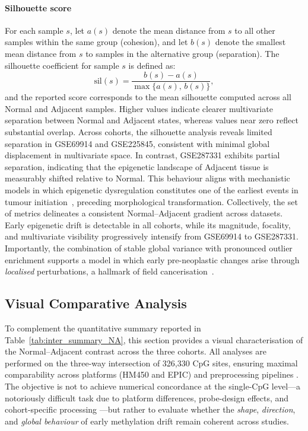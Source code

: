 \paragraph{Silhouette score}  

For each sample $s$, let $a(s)$ denote the mean distance from $s$ to all other samples within the same group (cohesion), and let $b(s)$ denote the smallest mean distance from $s$ to samples in the alternative group (separation).  
The silhouette coefficient for sample $s$ is defined as:
\begin{equation}
\mathrm{sil}(s) =
\frac{b(s) - a(s)}{\max\{a(s),\, b(s)\}},
\label{eq:silhouette}
\end{equation}
and the reported score corresponds to the mean silhouette computed across all Normal and Adjacent samples.
Higher values indicate clearer multivariate separation between Normal and Adjacent states, whereas values near zero reflect substantial overlap. Across cohorts, the silhouette analysis reveals limited separation in GSE69914 and GSE225845, consistent with minimal global displacement in multivariate space. In contrast, GSE287331 exhibits partial separation, indicating that the epigenetic landscape of Adjacent tissue is measurably shifted relative to Normal. This behaviour aligns with mechanistic models in which epigenetic dysregulation constitutes one of the earliest events in tumour initiation~\cite{Zhang2024_TumorInitiationEpigenetic}, preceding morphological transformation.
Collectively, the set of metrics delineates a consistent Normal--Adjacent gradient across datasets. Early epigenetic drift is detectable in all cohorts, while its magnitude, focality, and multivariate visibility progressively intensify from GSE69914 to GSE287331. Importantly, the combination of stable global variance with pronounced outlier enrichment supports a model in which early pre-neoplastic changes arise through \emph{localised} perturbations, a hallmark of field cancerisation~\cite{Teschendorff2016fielddefects, Yates2024_NormalMucosaField}.

\subsection{Visual Comparative Analysis}
\label{subsec:inter_visual}

To complement the quantitative summary reported in 
Table~\ref{tab:inter_summary_NA}, this section provides a visual 
characterisation of the Normal--Adjacent contrast across the three 
cohorts. All analyses are performed on the three-way intersection of 
326{,}330 CpG sites, ensuring maximal comparability across platforms 
(HM450 and EPIC) and preprocessing pipelines \cite{zhou2016}. The objective is not to achieve numerical concordance at the single-CpG 
level---a notoriously difficult task due to platform differences, 
probe-design effects, and cohort-specific processing 
\cite{Pidsley2016, Fortin2014_funnorm}---but rather to evaluate 
whether the \emph{shape}, \emph{direction}, and \emph{global behaviour} 
of early methylation drift remain coherent across studies.

